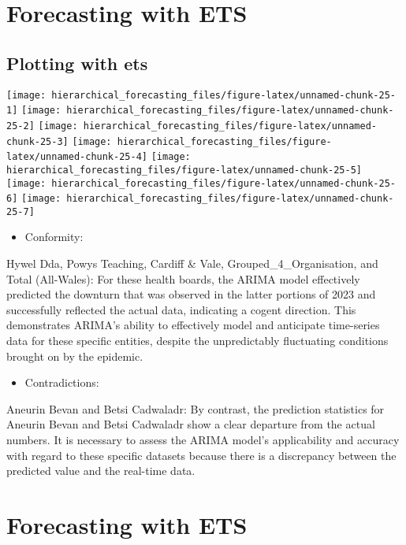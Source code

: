 \documentclass[
]{article}
\providecommand{\tightlist}{%
  \setlength{\itemsep}{0pt}\setlength{\parskip}{0pt}}
\begin{document}
\hypertarget{forecasting-with-ets}{%
\section{Forecasting with ETS}\label{forecasting-with-ets}}

\hypertarget{plotting-with-ets}{%
\subsection{Plotting with ets}\label{plotting-with-ets}}

\texttt{[image: hierarchical\_forecasting\_files/figure-latex/unnamed-chunk-25-1]}
\texttt{[image: hierarchical\_forecasting\_files/figure-latex/unnamed-chunk-25-2]}
\texttt{[image: hierarchical\_forecasting\_files/figure-latex/unnamed-chunk-25-3]}
\texttt{[image: hierarchical\_forecasting\_files/figure-latex/unnamed-chunk-25-4]}
\texttt{[image: hierarchical\_forecasting\_files/figure-latex/unnamed-chunk-25-5]}
\texttt{[image: hierarchical\_forecasting\_files/figure-latex/unnamed-chunk-25-6]}
\texttt{[image: hierarchical\_forecasting\_files/figure-latex/unnamed-chunk-25-7]}

\begin{itemize}
\tightlist
\item
  Conformity:
\end{itemize}

Hywel Dda, Powys Teaching, Cardiff \& Vale, Grouped\_4\_Organisation, and Total (All-Wales): For these health boards, the ARIMA model effectively predicted the downturn that was observed in the latter portions of 2023 and successfully reflected the actual data, indicating a cogent direction. This demonstrates ARIMA's ability to effectively model and anticipate time-series data for these specific entities, despite the unpredictably fluctuating conditions brought on by the epidemic.

\begin{itemize}
\tightlist
\item
  Contradictions:
\end{itemize}

Aneurin Bevan and Betsi Cadwaladr: By contrast, the prediction statistics for Aneurin Bevan and Betsi Cadwaladr show a clear departure from the actual numbers. It is necessary to assess the ARIMA model's applicability and accuracy with regard to these specific datasets because there is a discrepancy between the predicted value and the real-time data.

\hypertarget{forecasting-with-ets-1}{%
\section{Forecasting with ETS}\label{forecasting-with-ets-1}}
\end{document}
